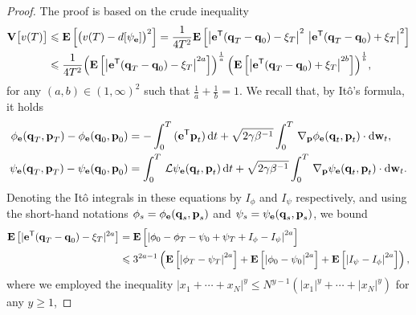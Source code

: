 \documentclass[11pt,a4paper]{article}
\begin{document}
\begin{proof}
    The proof is based on the crude inequality
    \begin{align}
        \notag
        \mathbf{V} \bigl[v(T)\bigr]
        &\leqslant \mathbf{E} \left[ \bigl( v(T) - d[\psi_{\boldsymbol{\mathbf e}}] \bigr)^2 \right]
        = \frac{1}{4 T^2} \mathbf{E} \left[ \left\lvert \boldsymbol{\mathbf e}^\mathsf T (\boldsymbol{\mathbf q}_T - \boldsymbol{\mathbf q}_0) - \xi_T \right\rvert^2 \, \left\lvert \boldsymbol{\mathbf e}^\mathsf T (\boldsymbol{\mathbf q}_T - \boldsymbol{\mathbf q}_0) + \xi_T \right\rvert^2 \right] \\
        \label{eq:bound_variance_two_factors}
        &\leqslant \frac{1}{4 T^2}
        {\left(\mathbf{E} \left[  \left\lvert \boldsymbol{\mathbf e}^\mathsf T(\boldsymbol{\mathbf q}_T - \boldsymbol{\mathbf q}_0) - \xi_T \right\rvert^{2a} \right]\right)^{\frac{1}{a}}} \,
        {\left(\mathbf{E} \left[ \left\lvert \boldsymbol{\mathbf e}^\mathsf T (\boldsymbol{\mathbf q}_T - \boldsymbol{\mathbf q}_0) + \xi_T \right\rvert^{2b} \right]\right)^{\frac{1}{b}}},
    \end{align}
    for any $(a, b) \in (1, \infty)^2$ such that $\frac{1}{a} + \frac{1}{b} = 1$.
    We recall that, by It\^o's formula, it holds
    \begin{align*}
        \phi_{\boldsymbol{\mathbf e}}(\boldsymbol{\mathbf q}_T, \boldsymbol{\mathbf p}_T) - \phi_{\boldsymbol{\mathbf e}}(\boldsymbol{\mathbf q}_0, \boldsymbol{\mathbf p}_0)
        &= - \int_{0}^{T} \, (\boldsymbol{\mathbf e}^\mathsf T \boldsymbol{\mathbf p}_t) \, \mathrm d t + \sqrt{2 \gamma \beta^{-1}} \int_{0}^{T} \, \nabla_{\boldsymbol{\mathbf p}} \phi_{\boldsymbol{\mathbf e}} (\boldsymbol{\mathbf q}_t, \boldsymbol{\mathbf p}_t) \cdot \mathrm d \boldsymbol{\mathbf w}_t, \\
        \psi_{\boldsymbol{\mathbf e}}(\boldsymbol{\mathbf q}_T, \boldsymbol{\mathbf p}_T) - \psi_{\boldsymbol{\mathbf e}}(\boldsymbol{\mathbf q}_0, \boldsymbol{\mathbf p}_0)
        &= \int_{0}^{T} \, \mathcal L \psi_{\boldsymbol{\mathbf e}}(\boldsymbol{\mathbf q}_t, \boldsymbol{\mathbf p}_t) \, \mathrm d t + \sqrt{2 \gamma \beta^{-1}} \int_{0}^{T} \, \nabla_{\boldsymbol{\mathbf p}} \psi_{\boldsymbol{\mathbf e}} (\boldsymbol{\mathbf q}_t, \boldsymbol{\mathbf p}_t) \cdot \mathrm d \boldsymbol{\mathbf w}_t.
    \end{align*}
    Denoting the It\^o integrals in these equations by $I_{\phi}$ and $I_{\psi}$ respectively,
    and using the short-hand notations $\phi_{s} = \phi_{\boldsymbol{\mathbf e}}(\boldsymbol{\mathbf q}_s, \boldsymbol{\mathbf p}_s)$ and $\psi_{s} = \psi_{\boldsymbol{\mathbf e}}(\boldsymbol{\mathbf q}_s, \boldsymbol{\mathbf p}_s)$,
    we bound
    \begin{align*}
        \expect \left[ |\vect e^\t(\vect q_T - \vect q_0) - \xi_T|^{2 a} \right]
        &= \expect \left[ \abs{\phi_{0} - \phi_{T} - \psi_{0} + \psi_{T}  + I_{\phi} - I_{\psi}}^{2 a} \right] \\
        &\leq 3^{2 a-1} \left( \expect \left[ \abs{\phi_T - \psi_T}^{2 a} \right] + \expect \left[ \abs{\phi_0 - \psi_0}^{2 a} \right] + \expect \left[ \abs{I_{\psi} - I_{\phi}}^{2 a} \right] \right),
    \end{align*}
    where we employed the inequality $|x_1 + \dotsb + x_N|^{y} \leq N^{y-1} \left( |x_1|^y + \dotsb + |x_N|^y \right)$ for any $y \geq 1$,

\end{proof}
\end{document}
